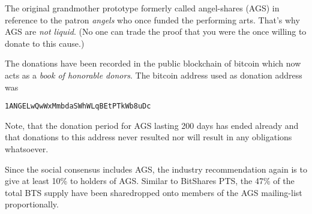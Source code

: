 The original grandmother prototype formerly called angel-shares (AGS) in
reference to the patron \emph{angels} who once funded the performing arts.
That's why AGS are \emph{not liquid}. (No one can trade the proof that you were
the once willing to donate to this cause.) 

The donations have been recorded in the public blockchain of bitcoin which now
acts as a \emph{book of honorable donors}. The bitcoin address used as donation
address was 
\begin{center}
 \texttt{1ANGELwQwWxMmbdaSWhWLqBEtPTkWb8uDc}
\end{center}
Note, that the donation period for AGS lasting 200 days has ended already and
that donations to this address never resulted nor will result in any
obligations whatsoever.

Since the social consensus includes AGS, the industry recommendation again is
to give at least 10\% to holders of AGS. Similar to BitShares PTS, the 47\% of
the total BTS supply have been sharedropped onto members of the AGS
mailing-list proportionally.
